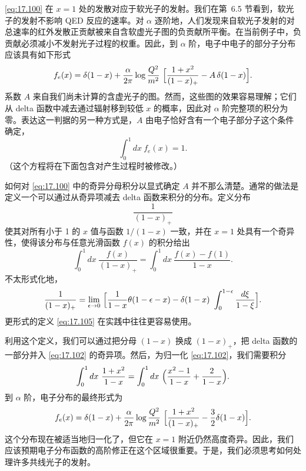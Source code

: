 \eqref{eq:17.100} 在 $x = 1$ 处的发散对应于软光子的发射。我们在第~6.5 节看到，软光子的发射不影响 QED 反应的速率。对 $\alpha$ 逐阶地，人们发现来自软光子发射的对总速率的红外发散正贡献被来自含软虚光子图的负贡献所平衡。在当前例子中，负贡献必须减小不发射光子过程的权重。因此，到 $\alpha$ 阶，电子中电子的部分子分布应该具有如下形式
\begin{equation}
  f_e(x) = \delta(1-x) + \frac{\alpha}{2\pi}\log\frac{Q^2}{m^2}\ \Bigl[
    \frac{1+x^2}{(1-x)_+} - A\,\delta(1-x) \Bigr] .
  \label{eq:17.102}
\end{equation}
系数 $A$ 来自我们尚未计算的含虚光子的图。然而，这些图的效果容易理解；它们从 delta 函数中减去通过辐射移到较低 $x$ 的概率，因此对 $\alpha$ 阶完整项的积分为零。表达这一判据的另一种方式是，$A$ 由电子恰好含有一个电子部分子这个条件确定，
\begin{equation}
  \int_0^1 dx\ f_e(x) = 1 .
  \label{eq:17.103}
\end{equation}
（这个方程将在下面包含对产生过程时被修改。）

如何对 \eqref{eq:17.100} 中的奇异分母积分以显式确定 $A$ 并不那么清楚。通常的做法是定义一个可以通过从奇异项减去 delta 函数来积分的分布。定义分布
\begin{equation}
  \frac{1}{(1-x)_+}
  \label{eq:17.104}
\end{equation}
使其对所有小于 1 的 $x$ 值与函数 $1/(1-x)$ 一致，并在 $x = 1$ 处具有一个奇异性，使得该分布与任意光滑函数 $f(x)$ 的积分给出
\begin{equation}
  \int_0^1 dx\ \frac{f(x)}{(1-x)_+} = \int_0^1 dx\ \frac{f(x) - f(1)}
    {1-x} .
  \label{eq:17.105}
\end{equation}
不太形式化地，
\begin{equation}
  \frac{1}{(1-x)_+} = \lim_{\epsilon\to 0}\ \Bigl[ \frac{1}{1-x}
    \theta(1-\epsilon-x) - \delta(1-x)\ \int_0^{1-\epsilon} \frac{d\xi}{1-\xi}
    \Bigr] .
  \label{eq:17.106}
\end{equation}
更形式的定义 \eqref{eq:17.105} 在实践中往往更容易使用。

利用这个定义，我们可以通过把分母 $(1-x)$ 换成 $(1-x)_+$，把 delta 函数的一部分并入 \eqref{eq:17.102} 的奇异项。然后，为归一化 \eqref{eq:17.102}，我们需要积分
\begin{equation}
  \int_0^1 dx\ \frac{1+x^2}{1-x} = \int_0^1 dx\ \Bigl( \frac{x^2-1}{1-x}
    + \frac{2}{1-x} \Bigr) .
\end{equation}
到 $\alpha$ 阶，电子分布的最终形式为
\begin{equation}
  f_e(x) = \delta(1-x) + \frac{\alpha}{2\pi}\log\frac{Q^2}{m^2}\ \Bigl[
    \frac{1+x^2}{(1-x)_+} - \frac{3}{2}\delta(1-x) \Bigr] .
  \label{eq:17.107}
\end{equation}
这个分布现在被适当地归一化了，但它在 $x = 1$ 附近仍然高度奇异。因此，我们应该预期电子分布函数的高阶修正在这个区域很重要。于是，我们必须思考如何处理许多共线光子的发射。

